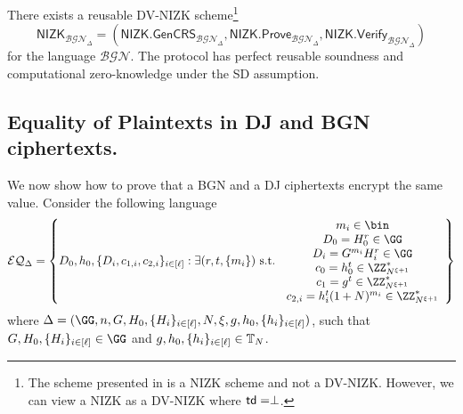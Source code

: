 \begin{lemma}
\label{lemma:GOSproof}
There exists a reusable DV-NIZK scheme\footnote{The scheme presented in \cite{EC:GroOstSah06} is a NIZK scheme and not a DV-NIZK. However, we can view a NIZK as a DV-NIZK where $\mathsf{td}=\perp$.} $$\mathsf{NIZK}_{\mathcal{BGN}_\Delta}=(\mathsf{NIZK.GenCRS}_{\mathcal{BGN}_\Delta},\mathsf{NIZK.Prove}_{\mathcal{BGN}_\Delta},\mathsf{NIZK.Verify}_{\mathcal{BGN}_\Delta})$$ for the language $\mathcal{BGN}$. The protocol has perfect reusable soundness and computational zero-knowledge under the SD assumption.
\end{lemma}

\subsection{Equality of Plaintexts in DJ and BGN ciphertexts.}


We now show how to prove that a BGN and a DJ ciphertexts encrypt the same value. Consider the following language
$$
    \mathcal{EQ}_\Delta= \left\{D_0,h_0,\{D_i,c_{1,i},c_{2,i}\}_{i\in [\ell]}: \exists (r,t,\{m_i\}) \text{ s.t. } \begin{array}{c}
m_i\in\bin\\
D_0=H_0^r\in\GG\\
     D_i=G^{m_i}H_i^r\in\GG \\
     c_0=h_0^t\in \ZZ^\ast_{N^{\xi+1}}\\
     c_{1}=g^{t}\in \ZZ^\ast_{N^{\xi+1}} \\ 
     c_{2,i}=h_i^{t}(1+N)^{m_i}\in \ZZ^\ast_{N^{\xi+1}}
\end{array} \right\}
$$
where $\Delta=(\GG,n,G,H_0,\{H_i\}_{i\in[\ell]},N,\xi,g,h_0,\{h_i\}_{i\in [\ell]})$, such that $G,H_0,\{H_i\}_{i\in[\ell]}\in\GG$ and  $g,h_0,\{h_i\}_{i\in [\ell]}\in \mathbb{T}_N$.%


